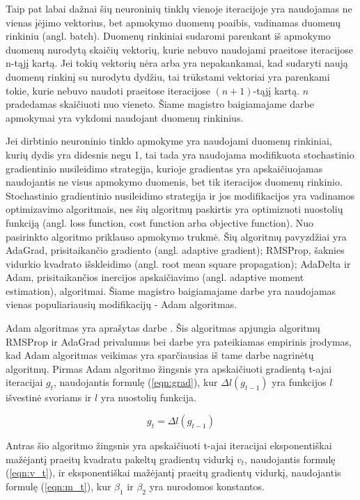 Taip pat labai dažnai šių neuroninių tinklų vienoje iteracijoje yra naudojamas ne vienas įėjimo vektorius, bet apmokymo duomenų poaibis, vadinamas duomenų rinkiniu (angl. batch). Duomenų rinkiniai sudaromi parenkant iš apmokymo duomenų nurodytą skaičių vektorių, kurie nebuvo naudojami praeitose iteracijose n-tąjį kartą. Jei tokių vektorių nėra arba yra nepakankamai, kad sudaryti naują duomenų rinkinį su nurodytu dydžiu, tai trūkstami vektoriai yra parenkami tokie, kurie nebuvo naudoti praeitose iteracijose $(n + 1)$-tąjį kartą. $n$ pradedamas skaičiuoti nuo vieneto. Šiame magistro baigiamajame darbe apmokymai yra vykdomi naudojant duomenų rinkinius.

Jei dirbtinio neuroninio tinklo apmokyme yra naudojami duomenų rinkiniai, kurių dydis yra didesnis negu 1, tai tada yra naudojama modifikuota stochastinio gradientinio nusileidimo strategija, kurioje gradientas yra apskaičiuojamas naudojantis ne visus apmokymo duomenis, bet tik iteracijos duomenų rinkinio. Stochastinio gradientinio nusileidimo strategija ir jos modifikacijos yra vadinamos optimizavimo algoritmais, nes šių algoritmų paskirtis yra optimizuoti nuostolių funkciją (angl. loss function, cost function arba objective function). Nuo pasirinkto algoritmo priklauso apmokymo trukmė. Šių algoritmų pavyzdžiai yra AdaGrad, prisitaikančio gradiento (angl. adaptive gradient); RMSProp, šaknies vidurkio kvadrato išskleidimo (angl. root mean square propagation); AdaDelta ir Adam, prisitaikančios inercijos apskaičiavimo (angl. adaptive moment estimation), algoritmai. Šiame magistro baigiamajame darbe yra naudojamas vienas populiariausių modifikacijų - Adam algoritmas.

Adam algoritmas yra aprašytas darbe \cite{adam}. Šis algoritmas apjungia algoritmų RMSProp ir AdaGrad privalumus bei darbe \cite{adam} yra pateikiamas empirinis įrodymas, kad Adam algoritmas veikimas yra sparčiausias iš tame darbe nagrinėtų algoritmų. Pirmas Adam algoritmo žingsnis yra apskaičiuoti gradientą t-ajai iteracijai $g_t$, naudojantis formulę (\ref{eqn:grad}), kur $\Delta l(g_{t-1})$ yra funkcijos $l$ išvestinė svoriams ir $l$ yra nuostolių funkcija.

\begin{equation}
\label{eqn:grad}
	g_t = \Delta l(g_{t-1})
\end{equation}

Antras šio algoritmo žingsnis yra apskaičiuoti t-ajai iteracijai eksponentiškai mažėjantį praeitų kvadratu pakeltų gradientų vidurkį $v_t$, naudojantis formulę (\ref{eqn:v_t}), ir eksponentiškai mažėjantį praeitų gradientų vidurkį, naudojantis formulę (\ref{eqn:m_t}), kur $\beta_1$ ir $\beta_2$ yra nurodomos konstantos.

